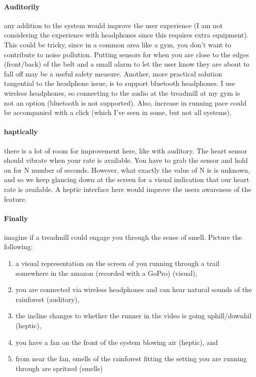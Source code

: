 \paragraph{Auditorily}
any addition to the system would improve the user experience (I am not considering the experience with headphones since this requires extra equipment). This could be tricky, since in a common area like a gym, you don't want to contribute to noise pollution. Putting sensors for when you are close to the edges (front/back) of the belt and a small alarm to let the user know they are about to fall off may be a useful safety measure. Another, more practical solution tangential to the headphone issue, is to support bluetooth headphones. I use wireless headphones, so connecting to the audio at the treadmill at my gym is not an option (bluetooth is not supported). Also, increase in running pace could be accompanied with a click (which I've seen in some, but not all systems).

\paragraph{haptically}
there is a lot of room for improvement here, like with auditory. The heart sensor should vibrate when your rate is available. You have to grab the sensor and hold on for N number of seconds. However, what exactly the value of N is is unknown, and so we keep glancing down at the screen for a visual indication that our heart rate is available. A heptic interface here would improve the users awareness of the feature.

\paragraph{Finally}
imagine if a treadmill could engage you through the sense of smell. Picture the following:

\begin{enumerate}
\item
  a visual representation on the screen of you running through a trail somewhere in the amazon (recorded with a GoPro) (visual),
\item
  you are connected via wireless headphones and can hear natural sounds of the rainforest (auditory),
\item
  the incline changes to whether the runner in the video is going uphill/downhil (heptic),
\item
  you have a fan on the front of the system blowing air (heptic), and
\item
  from near the fan, smells of the rainforest fitting the setting you are running through are spritzed (smells)
\end{enumerate}

